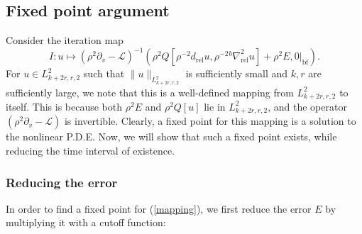 \documentclass[10pt, a4paper]{article}
\theoremstyle{plain}%
\theoremstyle{definition}
\numberwithin{figure}{section}
\numberwithin{equation}{section}
\newcommand{\pa}{\partial}
\newcommand{\rel}{\mathrm{rel}}
\newcommand{\botf}{\textrm{bf}}
\begin{document}
\subsection{Fixed point argument}
Consider the iteration map 
\begin{equation}\label{mapping}
	I: u\mapsto (\rho^2\partial_v-\mathcal{L})^{-1}(\rho^2Q[\rho^{-2}d_\rel u, \rho^{-2}{^b\nabla}_\rel^2u]+\rho^2E, 0|_{\botf}).
\end{equation}
For $u\in L^2_{k+2r,r,2}$ such that $\|u\|_{L^2_{k+2r,r,2}}$ is sufficiently small and $k,r$ are sufficiently large, we note that this is a well-defined mapping from $L^2_{k+2r,r,2}$ to itself. This is because both $\rho^2E$ and $\rho^2Q[u]$ lie in $L^2_{k+2r,r,2}$, and the operator $(\rho^2\pa_v-\mathcal{L})$ is invertible. Clearly, a fixed point for this mapping is a solution to the nonlinear P.D.E. Now, we will show that such a fixed point exists, while reducing the time interval of existence.
\subsubsection{Reducing the error}

In order to find a fixed point for (\ref{mapping}), we first reduce the error $E$ by multiplying it with a cutoff function:
\end{document}
